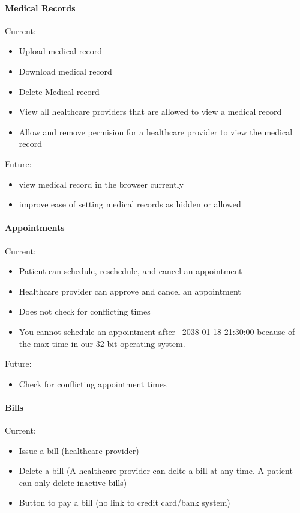 \documentclass[12pt]{report}
\begin{document}
\paragraph{Medical Records}

Current: 
\begin{itemize}
\item Upload medical record
\item Download medical record
\item Delete Medical record
\item View all healthcare providers that are allowed to view a medical record
\item Allow and remove permision for a healthcare provider to view the medical record
\end{itemize}

Future:
\begin{itemize}
\item view medical record in the browser currently 
\item improve ease of setting medical records as hidden or allowed
\end{itemize}

\paragraph{Appointments}

Current: 
\begin{itemize}
\item Patient can schedule, reschedule, and cancel an appointment
\item Healthcare provider can approve and cancel an appointment
\item Does not check for conflicting times 
\item You cannot schedule an appointment after ~2038-01-18 21:30:00 because of the max time in our 32-bit operating system. 
\end{itemize}

Future: 
\begin{itemize}
\item Check for conflicting appointment times
\end{itemize}

\paragraph{Bills}

Current:
\begin{itemize}
\item Issue a bill (healthcare provider)
\item Delete a bill (A healthcare provider can delte a bill at any time. A patient can only delete inactive bills)
\item Button to pay a bill (no link to credit card/bank system)
\end{itemize}
\end{document}
